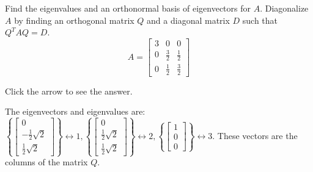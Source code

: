 \documentclass{ximera}
\begin{document}
 \begin{problem}\label{prb:9.7} Find the eigenvalues and an orthonormal basis of eigenvectors for $A.$
Diagonalize $A$ by finding an orthogonal matrix $Q$ and a diagonal matrix $D$
such that $Q^{T}AQ=D$.\
\begin{equation*}
A=\left[
\begin{array}{rrr}
3 & 0 & 0 \\
0 &  \frac{3}{2} &  \frac{1}{2} \\
0 &  \frac{1}{2} &  \frac{3}{2}
\end{array}
\right]
\end{equation*}

Click the arrow to see the answer. \begin{expandable}
The eigenvectors and eigenvalues are: $\left\{ \left[
\begin{array}{c}
0 \\
-\frac{1}{2}\sqrt{2} \\
\frac{1}{2}\sqrt{2}
\end{array}
\right] \right\} \leftrightarrow 1,\left\{ \left[
\begin{array}{c}
0 \\
\frac{1}{2}\sqrt{2} \\
\frac{1}{2}\sqrt{2}
\end{array}
\right] \right\} \leftrightarrow 2,\left\{ \left[
\begin{array}{c}
1 \\
0 \\
0
\end{array}
\right] \right\} \leftrightarrow 3.$ These vectors are the columns of the
matrix $Q$.
\end{expandable} 
\end{problem}
\end{document}
